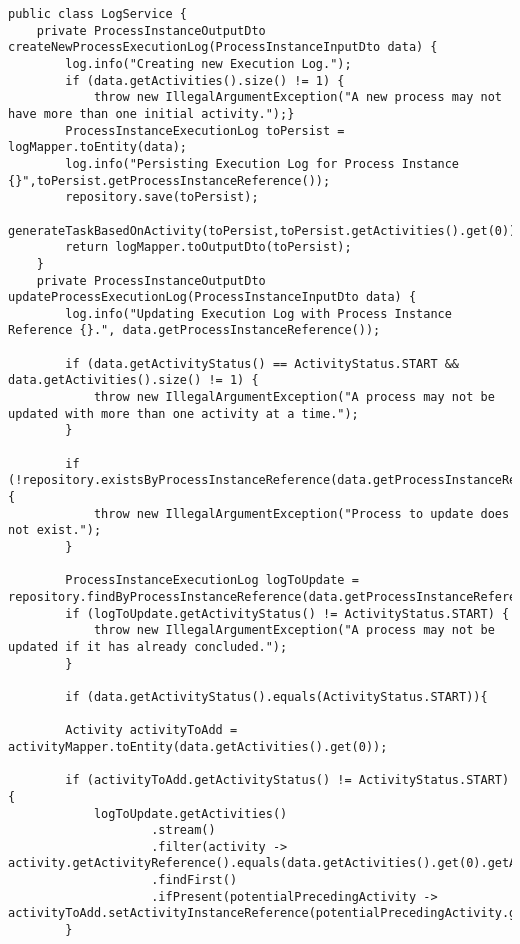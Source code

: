 \begin{listing}
  \begin{verbatim}
public class LogService {
    private ProcessInstanceOutputDto createNewProcessExecutionLog(ProcessInstanceInputDto data) {
        log.info("Creating new Execution Log.");
        if (data.getActivities().size() != 1) {
            throw new IllegalArgumentException("A new process may not have more than one initial activity.");}
        ProcessInstanceExecutionLog toPersist = logMapper.toEntity(data);
        log.info("Persisting Execution Log for Process Instance {}",toPersist.getProcessInstanceReference());
        repository.save(toPersist);
        generateTaskBasedOnActivity(toPersist,toPersist.getActivities().get(0));
        return logMapper.toOutputDto(toPersist);
    }
    private ProcessInstanceOutputDto updateProcessExecutionLog(ProcessInstanceInputDto data) {
        log.info("Updating Execution Log with Process Instance Reference {}.", data.getProcessInstanceReference());

        if (data.getActivityStatus() == ActivityStatus.START && data.getActivities().size() != 1) {
            throw new IllegalArgumentException("A process may not be updated with more than one activity at a time.");
        }

        if (!repository.existsByProcessInstanceReference(data.getProcessInstanceReference())) {
            throw new IllegalArgumentException("Process to update does not exist.");
        }

        ProcessInstanceExecutionLog logToUpdate = repository.findByProcessInstanceReference(data.getProcessInstanceReference()).orElseThrow();
        if (logToUpdate.getActivityStatus() != ActivityStatus.START) {
            throw new IllegalArgumentException("A process may not be updated if it has already concluded.");
        }

        if (data.getActivityStatus().equals(ActivityStatus.START)){

        Activity activityToAdd = activityMapper.toEntity(data.getActivities().get(0));

        if (activityToAdd.getActivityStatus() != ActivityStatus.START){
            logToUpdate.getActivities()
                    .stream()
                    .filter(activity -> activity.getActivityReference().equals(data.getActivities().get(0).getActivityReference()))
                    .findFirst()
                    .ifPresent(potentialPrecedingActivity -> activityToAdd.setActivityInstanceReference(potentialPrecedingActivity.getActivityInstanceReference()));
        }


\end{verbatim}
\end{listing}
